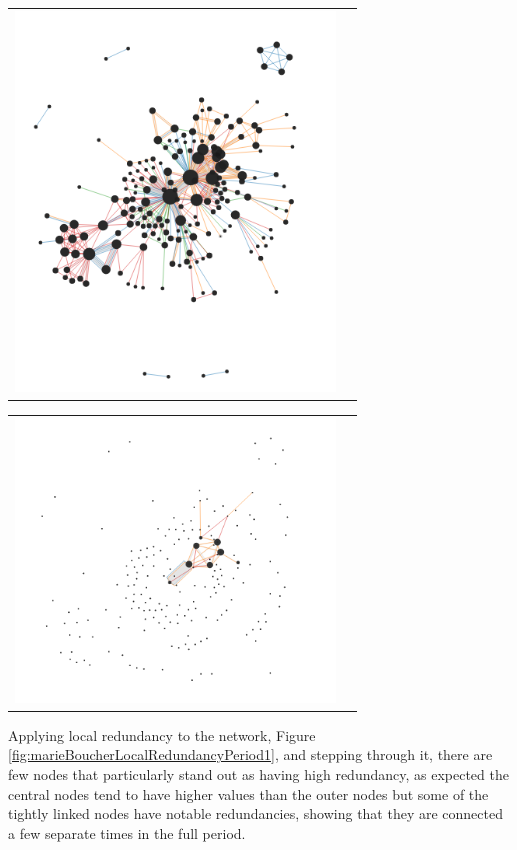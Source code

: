 \begin{center}
\begin{tabular}{cc}
\includegraphics[trim={0 0 0 0}, width=85mm]{./Figures/marieBoucherLocalCentralityFull.png}
\end{tabular}
\label{fig:marieBoucherLocalCentralityFull}
\end{center}   


\begin{center}
\begin{tabular}{cc}
\includegraphics[trim={0 0 0 0}, width=85mm]{./Figures/marieBoucherLocalRedundancyPeriod1.png}
\end{tabular}
\label{fig:marieBoucherLocalRedundancyPeriod1}
\end{center}   
Applying local redundancy to the network, Figure \ref{fig:marieBoucherLocalRedundancyPeriod1}, and stepping through it, there are few nodes that particularly stand out as having high redundancy, as expected the central nodes tend to have higher values than the outer nodes but some of the tightly linked nodes have notable redundancies, showing that they are connected a few separate times in the full period.

